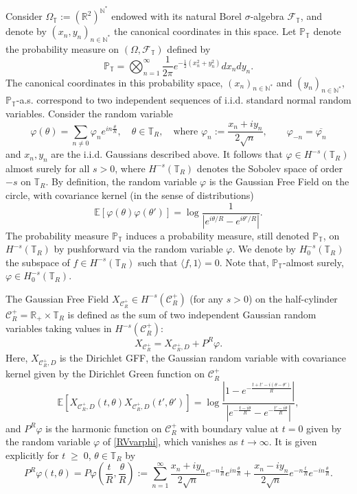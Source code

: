 \documentclass[11pt]{amsart}
\numberwithin{equation}{section}
\theoremstyle{definition}
\renewcommand{\geq}{\;\geqslant\;}                   %
\newcommand{\R}{\mathbb{R}}
\newcommand{\N}{\mathbb{N}}
\newcommand{\cjd}{\rangle}
\newcommand{\cjg}{\langle}
\def\P{\mathbb{P}}
\def\E{\mathbb{E}}
\newcommand{\mc}{\mathcal}
\def\T{\mathbb{T}}
\def\cF{\mathcal{F}}
\begin{document}
Consider $\Omega_\T := (\R^2)^{\N^*}$ endowed with its natural Borel $\sigma$-algebra $\cF_\T$, and denote by $(x_n,y_n)_{n \in \N^*}$ the canonical coordinates in this space. Let $\P_\T$ denote the probability measure on $(\Omega,\cF_\T)$ defined by
\begin{equation}\label{Gaussian_measure}
\P_\T
=
\bigotimes_{n=1}^\infty \frac{1}{2\pi} e^{-\frac 12(x_n^2 + y_n^2)} dx_n dy_n.
\end{equation}
The canonical coordinates in this probability space, $(x_n)_{n \in \N^*}$ and $(y_n)_{n \in \N^*}$, $\P_\T$-a.s. correspond to two independent sequences of i.i.d. standard normal random variables. 
Consider the random variable 
\begin{equation}\label{RVvarphi}
\varphi(\theta)
=
\sum_{n \neq 0} \varphi_{n} e^{ i n \frac{\theta}{R}},  \quad\theta \in \T_R,
\quad \textrm{where } \varphi_{n} 
:= 
\frac{x_n + i y_n}{2 \sqrt n} , \qquad \varphi_{-n} = \overline{\varphi_{n}}
\end{equation}
and $x_n,y_n$ are the i.i.d. Gaussians described above. It follows that $\varphi \in H^{-s}(\T_R)$ almost surely for all $s>0$, where $H^{-s}(\T_R)$ denotes the Sobolev space of order $-s$ on $\T_R$.
By definition, the random variable $\varphi$ is the Gaussian Free Field on the circle, with covariance kernel (in the sense of distributions)
\[ \E[\varphi(\theta)\varphi(\theta')]=\log \frac{1}{|e^{i \theta/R}-e^{i \theta'/R}|}.\]
The probability measure $\P_{\T}$ induces a probability measure, still denoted $\P_\T$, on $H^{-s}(\T_R)$ by pushforward via the random variable $\varphi$. 
We denote by $H_0^{-s}(\T_R)$ the subspace of $f \in H^{-s}(\T_R)$ such that $\cjg f,1\cjd=0$. 
Note that, $\P_\T$-almost surely, $\varphi \in H_0^{-s}(\T_R)$.


The Gaussian Free Field $X_{\mc{C}^+_R}\in H^{-s}(\mc{C}_R^+)$ (for any $s>0$) on the half-cylinder $\mc{C}_R^+=\R_+ \times \T_R$ is defined as the sum of two independent Gaussian random variables taking values in $H^{-s}(\mc{C}_R^+)$: 
\[ X_{\mc{C}_R^+}=X_{\mc{C}_R^+,D}+P^R\varphi.\]
Here, $X_{\mc{C}_R^+,D}$ is the Dirichlet GFF, the Gaussian random variable with covariance kernel given by the Dirichlet Green function on $\mc{C}_R^+$
\[ \E[X_{\mc{C}_R^+,D}(t,\theta)X_{\mc{C}_R^+,D}(t',\theta')]= \log\frac{|1-e^{-\frac{t+t'-i(\theta-\theta')}{R}}|}{|e^{-\frac{t-i\theta}{R}}-e^{-\frac{t'-i\theta}{R}}|}, \]
and $P^R\varphi$ is the harmonic function on $\mc{C}_R^+$ with boundary value at $t=0$ given by the random variable $\varphi$ of \eqref{RVvarphi}, which vanishes as $t\to \infty$. It is given explicitly for $t\geq 0$, $\theta\in \T_R$ by 
\begin{equation}\label{PRvarphi}
P^R\varphi(t,\theta)=P\varphi(\frac{t}{R},\frac{\theta}{R}):=\sum_{n=1}^\infty 
\frac{x_n+iy_n}{2\sqrt{n}}e^{-n\frac{t}{R}}e^{in\frac{\theta}{R}}+\frac{x_n-iy_n}{2\sqrt{n}}e^{-n\frac{t}{R}}e^{-in\frac{\theta}{R}}.\end{equation}
\end{document}
